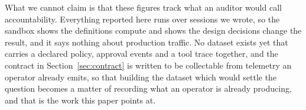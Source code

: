 \documentclass[11pt,a4paper]{article}
\begin{document}
What we cannot claim is that these figures track what an auditor would call
accountability. Everything reported here runs over sessions we wrote, so the sandbox
shows the definitions compute and shows the design decisions change the result, and it
says nothing about production traffic. No dataset exists yet that carries a declared
policy, approval events and a tool trace together, and the contract in
Section~\ref{sec:contract} is written to be collectable from telemetry an operator
already emits, so that building the dataset which would settle the question
becomes a matter of recording what an operator is already producing, and that is the
work this paper points at.




\end{document}
